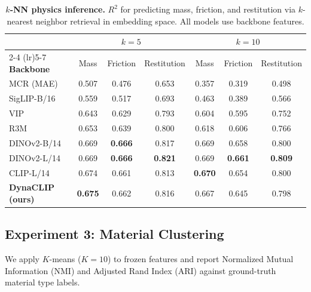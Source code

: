 \documentclass{article}
\newcommand{\methodname}{DynaCLIP}
\begin{document}
\begin{table}[h]
\centering
\caption{\textbf{$k$-NN physics inference.} $R^2$ for predicting mass, friction, and restitution via $k$-nearest neighbor retrieval in embedding space. All models use backbone features.}
\label{tab:knn}
\begin{tabular}{lcccccc}
\toprule
& \multicolumn{3}{c}{$k=5$} & \multicolumn{3}{c}{$k=10$} \\
\cmidrule(lr){2-4} \cmidrule(lr){5-7}
\textbf{Backbone} & Mass & Friction & Restitution & Mass & Friction & Restitution \\
\midrule
MCR (MAE)~\cite{radosavovic2023vc1} & 0.507 & 0.476 & 0.653 & 0.357 & 0.319 & 0.498 \\
SigLIP-B/16       & 0.559 & 0.517 & 0.693 & 0.463 & 0.389 & 0.566 \\
VIP~\cite{ma2022vip}             & 0.643 & 0.629 & 0.793 & 0.604 & 0.595 & 0.752 \\
R3M~\cite{nair2022r3m}             & 0.653 & 0.639 & 0.800 & 0.618 & 0.606 & 0.766 \\
DINOv2-B/14       & 0.669 & \textbf{0.666} & 0.817 & 0.669 & 0.658 & 0.800 \\
DINOv2-L/14       & 0.669 & \textbf{0.666} & \textbf{0.821} & 0.669 & \textbf{0.661} & \textbf{0.809} \\
CLIP-L/14         & 0.674 & 0.661 & 0.813 & \textbf{0.670} & 0.654 & 0.800 \\
\midrule
\textbf{\methodname{} (ours)} & \textbf{0.675} & 0.662 & 0.816 & 0.667 & 0.645 & 0.798 \\
\bottomrule
\end{tabular}
\end{table}


\subsection{Experiment 3: Material Clustering}
\label{sec:exp3}

We apply $K$-means ($K{=}10$) to frozen features and report Normalized Mutual Information (NMI) and Adjusted Rand Index (ARI) against ground-truth material type labels.
\end{document}
